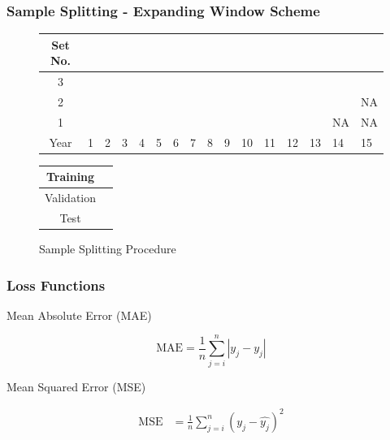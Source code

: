 \documentclass[aspectratio=169]{beamer}
\begin{document}
\begin{frame}
\frametitle{Sample Splitting - Expanding Window Scheme}
\begin{figure}
	\begin{center}
		\begin{tabular}{|c|p{0.40cm}p{0.40cm}p{0.40cm}p{0.40cm}p{0.40cm}p{0.40cm}p{0.40cm}p{0.40cm}p{0.40cm}p{0.40cm}p{0.40cm}p{0.40cm}p{0.40cm}p{0.40cm}p{0.40cm}|}
			\hline
			Set No. &&&&&&&&&&&&&&& \\
			\hline
			3 & \cellcolor{cyan} & \cellcolor{cyan} & \cellcolor{cyan} & \cellcolor{cyan} & \cellcolor{cyan} & \cellcolor{cyan} & \cellcolor{cyan} & \cellcolor{cyan} & \cellcolor{cyan} &
			\cellcolor{pink} & \cellcolor{pink} & \cellcolor{pink} & \cellcolor{pink} & \cellcolor{pink} & 	
			\cellcolor{olive} \\
			2 & \cellcolor{cyan} & \cellcolor{cyan} & \cellcolor{cyan} & \cellcolor{cyan} & \cellcolor{cyan} & \cellcolor{cyan} & \cellcolor{cyan} & \cellcolor{cyan} &
			\cellcolor{pink} & \cellcolor{pink} & \cellcolor{pink} & \cellcolor{pink} & \cellcolor{pink} & 	
			\cellcolor{olive} & NA  \\
			1 & \cellcolor{cyan} & \cellcolor{cyan} & \cellcolor{cyan} & \cellcolor{cyan} & \cellcolor{cyan} & \cellcolor{cyan} & \cellcolor{cyan} &
			\cellcolor{pink} & \cellcolor{pink} & \cellcolor{pink} & \cellcolor{pink} & \cellcolor{pink} & 	
			\cellcolor{olive} & NA & NA \\
			\hline
			Year & 1 & 2 & 3 & 4 & 5 & 6 & 7 & 8 & 9 & 10 & 11 & 12 & 13 & 14 & 15\\
			\hline
		\end{tabular}
		\medskip
		\begin{tabular}{|c|p{0.40cm}|}
			\hline
			Training & \cellcolor{cyan} \\
			\hline
			Validation & \cellcolor{pink} \\
			\hline
			Test & \cellcolor{olive} \\
			\hline
		\end{tabular}
	\end{center}
	\caption{Sample Splitting Procedure}
	\label{sample_split_diag}
\end{figure}
\end{frame}


\begin{frame}
\frametitle{Loss Functions}
Mean Absolute Error (MAE)

	\begin{equation}
	\text{MAE} = \frac{1}{n} \sum_{j = i}^{n} |y_j - \hat{y_j}|
	\end{equation}
	
Mean Squared Error (MSE)

	\begin{align}
	\text{MSE} &= \frac{1}{n} \sum_{j = i}^{n} \left( y_j - \hat{y_j}\right) ^2
	\end{align}

\end{frame}
\end{document}
